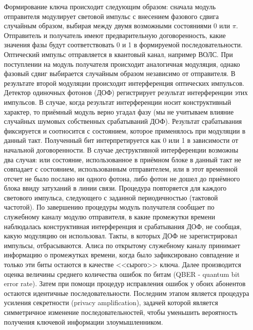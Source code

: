 Формирование ключа происходит следующим образом: сначала модуль отправителя модулирует световой импульс с внесением фазового сдвига случайным образом, выбирая между двумя возможными состояниями 0 или $\pi$. Отправитель и получатель имеют предварительную договоренность, какие значения фазы будут соответствовать 0 и 1 в формируемой последовательности. Оптический импульс отправляется в квантовый канал, например ВОЛС. При поступлении на модуль получателя происходит аналогичная модуляция, однако фазовый сдвиг выбирается случайным образом независимо от отправителя. В результате второй модуляции происходит интерференция оптических импульсов. Детектор одиночных фотонов (ДОФ) регистрирует результат интерференции этих импульсов. В случае, когда результат интерференции носит конструктивный характер, то приёмный модуль верно угадал фазу (мы не учитываем влияние случайных шумовых собственных срабатываний ДОФ). Результат срабатывания фиксируется и соотносится с состоянием, которое применялось при модуляции в данный такт. Полученный бит интерпретируется как 0 или 1 в зависимости от начальной договоренности. В случае деструктивной интерференции возможны два случая: или состояние, использованное в приёмном блоке в данный такт не совпадает с состоянием, использованным отправителем, или в этот временной отсчет не было послано ни одного фотона, либо фотон не дошел до приёмного блока ввиду затуханий в линии связи. Процедура повторяется для каждого светового импульса, следующего с заданной периодичностью (тактовой частотой). По завершению процедуры модуль получателя сообщает по служебному каналу модулю отправителя, в какие промежутки времени наблюдалась конструктивная интерференция и срабатывания ДОФ, не сообщая, какую модуляцию он использовал. Такты, в которых ДОФ не зарегистрировал импульсы, отбрасываются. Алиса по открытому служебному каналу принимает информацию о промежутках времени, когда было зафиксировано совпадение и только эти биты остаются в качестве <<сырого>> ключа. Далее производится оценка величины среднего количества ошибок по битам (QBER - quantum bit error rate). Затем при помощи процедур исправления ошибок у обоих абонентов остаются идентичные последовательности. Последним этапом является процедура усиления секретности (privacy amplification), задачей которой является симметричное изменение последовательностей, чтобы уменьшить вероятность получения ключевой информации злоумышленником.


